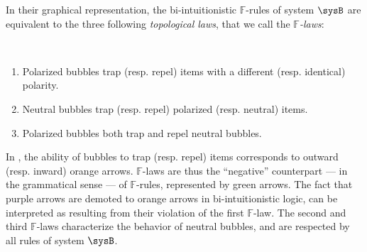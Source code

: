 \begin{description}
  In their graphical representation, the bi-intuitionistic $\mathbb{F}$-rules of
  system $\sysB$ are equivalent to the three following \emph{topological laws},
  that we call the \emph{$\mathbb{F}$-laws}:
  \begin{fact}
    ~\\\vspace{-1em}
    \begin{enumerate}
      \item Polarized bubbles trap (resp. repel) items with a different (resp.
      identical) polarity.
      \item Neutral bubbles trap (resp. repel) polarized (resp. neutral) items.
      \item Polarized bubbles both trap and repel neutral bubbles.
    \end{enumerate}
  \end{fact}
  In , the ability of bubbles to trap (resp. repel)
  items corresponds to outward (resp. inward) orange arrows. $\mathbb{F}$-laws
  are thus the ``negative'' counterpart --- in the grammatical sense --- of
  $\mathbb{F}$-rules, represented by green arrows. The fact that purple arrows
  are demoted to orange arrows in bi-intuitionistic logic, can be interpreted as
  resulting from their violation of the first $\mathbb{F}$-law. The second and
  third $\mathbb{F}$-laws characterize the behavior of neutral bubbles, and are
  respected by all rules of system $\sysB$.
  

\end{description}
